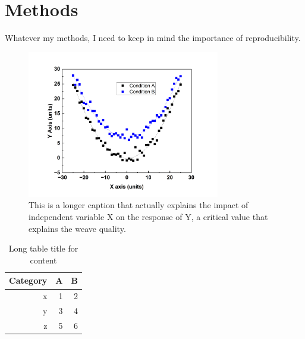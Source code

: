 \chapter{Methods}

Whatever my methods, I need to keep in mind the importance of reproducibility.\cite{Sholl2019}

\begin{figure}[htbp]
	\centering
	\includegraphics[width=0.75\textwidth]{./images/example}
	\caption[Short title for TOC]{This is a longer caption that actually explains the impact of independent variable X on the response of Y, a critical value that explains the weave quality.}
	\label{fig:sample}
\end{figure}

\begin{table}[htbp]
	\centering
	\caption[Short table title for TOC]{Long table title for content}
	\begin{tabular}{rrr}
	\toprule
	Category & A & B\\
	\midrule
	x & 1 & 2\\
	y & 3 & 4\\
	z & 5 & 6\\
	\bottomrule
	\end{tabular}
	\label{tab:sample}
\end{table}